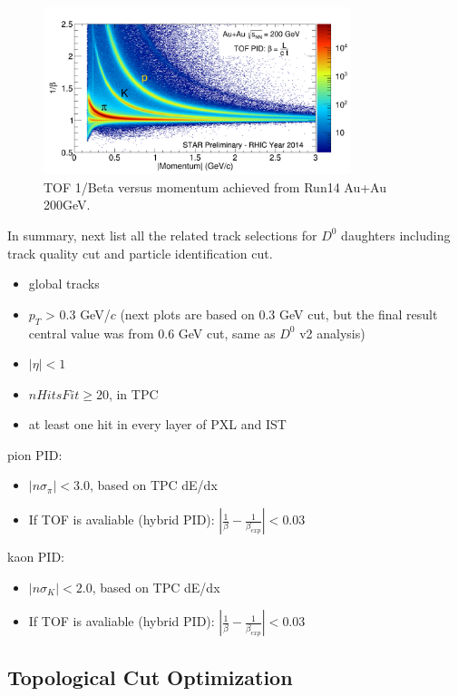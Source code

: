 \documentclass[a4paper]{article}
\begin{document}
\begin{figure}[htbp]
\centering
\includegraphics[keepaspectratio,width=0.8\textwidth]{fig/Run14_AuAu_tofBeta_PR.png}
\caption{TOF 1/Beta versus momentum achieved from Run14 Au+Au 200GeV.}
 \label{fig:tofPID}
\end{figure}

In summary, next list all the related track selections for $D^0$ daughters including track quality cut and particle identification cut.
\begin{itemize}
\item global tracks
\item $p_{T}$ > 0.3 GeV/$c$ (next plots are based on 0.3 GeV cut, but the final result central value was from 0.6 GeV cut, same as $D^0$ v2 analysis)
\item $|\eta| < 1$
\item $nHitsFit \ge 20$, in TPC
\item at least one hit in every layer of PXL and IST
\end{itemize}

pion PID:
\begin{itemize}
  \item $|n\sigma_{\pi}| < 3.0 $, based on TPC dE/dx
  \item If TOF is avaliable (hybrid PID):  $|\frac{1}{\beta}-\frac{1}{\beta_{exp}}|<0.03$
\end{itemize}

kaon PID:
\begin{itemize}
  \item $|n\sigma_{K}| < 2.0 $, based on TPC dE/dx
  \item If TOF is avaliable (hybrid PID):  $|\frac{1}{\beta}-\frac{1}{\beta_{exp}}|<0.03$
\end{itemize}


\subsection{Topological Cut Optimization}
\end{document}
